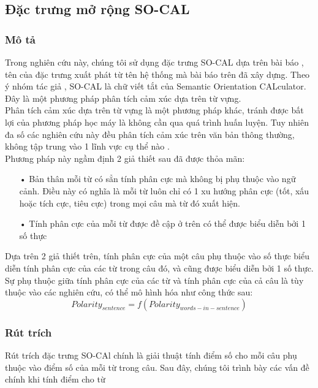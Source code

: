 \subsection{Đặc trưng mở rộng SO-CAL} \label{sec:socal}
\subsubsection*{Mô tả}
Trong nghiên cứu này, chúng tôi sử dụng đặc trưng SO-CAL dựa trên bài báo \cite{taboada2011lexicon}, tên của đặc trưng xuất phát từ tên hệ thống mà bài báo trên đã xây dựng. Theo ý nhóm tác giả \cite{taboada2011lexicon}, SO-CAL là chữ viết tắt của Semantic Orientation CALculator. Đây là một phương pháp phân tích cảm xúc dựa trên từ vựng.\\

Phân tích cảm xúc dựa trên từ vựng là một phương pháp khác, tránh được bất lợi của phương pháp học máy là không cần qua quá trình huấn luyện. Tuy nhiên đa số các nghiên cứu này đều phân tích cảm xúc trên văn bản thông thường, không tập trung vào 1 lĩnh vực cụ thể nào \cite{taboada2011lexicon,Zhang2011,ohana2009sentiment,Giachanou2016}. \\

Phương pháp này ngầm định 2 giả thiết sau đã được thỏa mãn:
\begin{itemize}
\item[•] Bản thân mỗi từ có sẳn tính phân cực mà không bị phụ thuộc vào ngữ cảnh. Điều này có nghĩa là mỗi từ luôn chỉ có 1 xu hướng phân cực (tốt, xấu hoặc tích cực, tiêu cực) trong mọi câu mà từ đó xuất hiện.
\item[•] Tính phân cực của mỗi từ được đề cập ở trên có thể được biểu diễn bởi 1 số thực
\end{itemize}
Dựa trên 2 giả thiết trên, tính phân cực của một câu phụ thuộc vào số thực biểu diễn tính phân cực của các từ trong câu đó, và cũng được biểu diễn bởi 1 số thực. Sự phụ thuộc giữa tính phân cực của các từ và tính phân cực của cả câu là tùy thuộc vào các nghiên cứu, có thể mô hình hóa như công thức sau:
\begin{equation}
Polarity_{sentence}=f(Polarity_{words-in-sentence})
\end{equation}
\subsubsection*{Rút trích}
Rút trích đặc trưng SO-CAl chính là giải thuật tính điểm số cho mỗi câu phụ thuộc vào điểm số của mỗi từ trong câu. Sau đây, chúng tôi trình bày các vấn đề chính khi tính điểm cho từ
